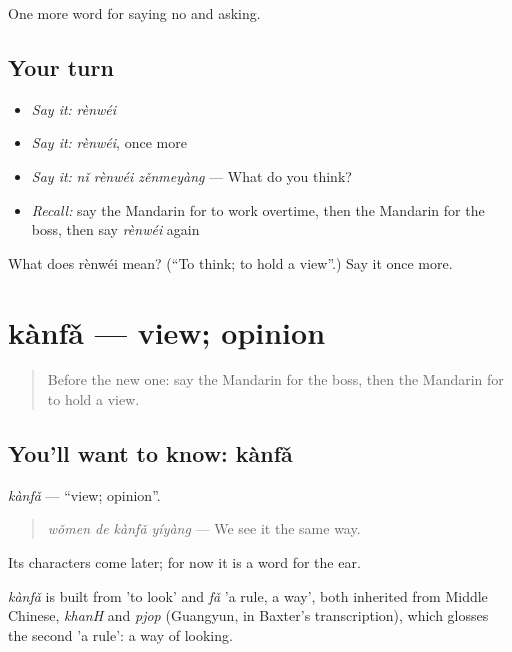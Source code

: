 \begin{grammarlens}[title={What you've built}]
One more word for saying no and asking.
\end{grammarlens}

\subsection*{Your turn}
\begin{itemize}
\raggedright
  \item \emph{Say it:} \emph{rènwéi}
  \item \emph{Say it:} \emph{rènwéi}, once more
  \item \emph{Say it:} \emph{nǐ rènwéi zěnmeyàng} — What do you think?
  \item \emph{Recall:} say the Mandarin for to work overtime, then the Mandarin for the boss, then say \emph{rènwéi} again
\end{itemize}

\begin{tcolorbox}[breakable,colback=teal!4,colframe=teal!35!black,title={Before you move on}]
What does rènwéi mean? (\textquotedblleft{}To think; to hold a view\textquotedblright{}.) Say it once more.
\end{tcolorbox}
\section[kànfǎ]{kànfǎ — view; opinion}

\label{lesson:ZH-C256-kanfa}



\begin{quote}
Before the new one: say the Mandarin for the boss, then the Mandarin for to hold a view.
\end{quote}

\subsection*{You'll want to know: kànfǎ}
\emph{kànfǎ} — \textquotedblleft{}view; opinion\textquotedblright{}.

\begin{quote}
\emph{wǒmen de kànfǎ yíyàng} — We see it the same way.
\end{quote}

Its characters come later; for now it is a word for the ear.

\begin{cousinweb}
\emph{kànfǎ} is built from  'to look' and \emph{fǎ} 'a rule, a way', both inherited from Middle Chinese, \emph{khanH} and \emph{pjop} (Guangyun, in Baxter's transcription), which glosses the second 'a rule': a way of looking.
\end{cousinweb}

